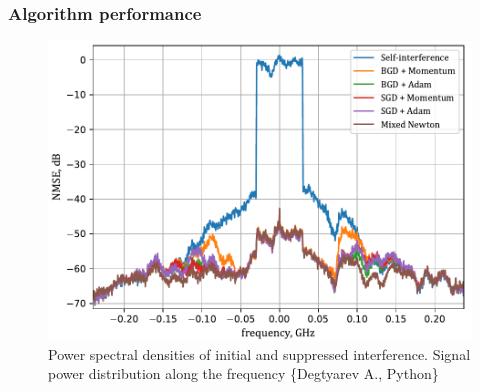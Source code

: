 \documentclass{beamer}
\begin{document}
\begin{frame}
	\frametitle{Algorithm performance}
	\begin{figure}[htbp]
		\centering
		\includegraphics[scale=0.55]{../figures/psd/psd.pdf}
		\centering
		\caption{Power spectral densities of initial and suppressed interference. Signal power distribution along the frequency \{Degtyarev A., Python\}}
	\end{figure}
\end{frame}
\end{document}
